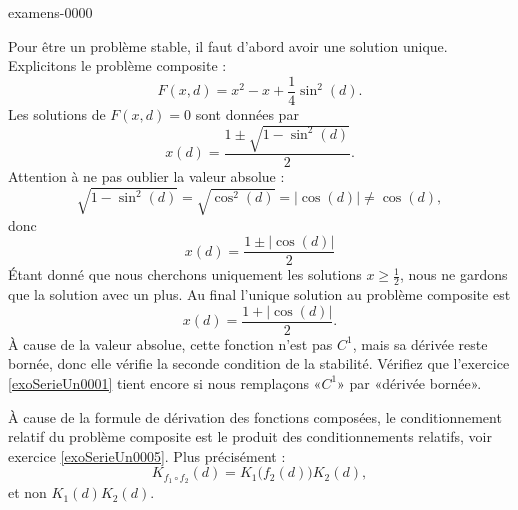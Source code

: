 
\begin{corrige}{examens-0000}

Pour être un problème stable, il faut d'abord avoir une solution unique. Explicitons le problème composite :
\begin{equation}
	F(x,d)=x^2-x+\frac{1}{ 4 }\sin^2(d).
\end{equation}
Les solutions de $F(x,d)=0$ sont données par
\begin{equation}
	x(d)=\frac{ 1\pm\sqrt{1-\sin^2(d)} }{2}.
\end{equation}
Attention à ne pas oublier la valeur absolue :
\begin{equation}
	\sqrt{1-\sin^2(d)}=\sqrt{\cos^2(d)}=| \cos(d) |\neq\cos(d),
\end{equation}
donc
\begin{equation}
	x(d)=\frac{ 1\pm| \cos(d) | }{2}
\end{equation}
Étant donné que nous cherchons uniquement les solutions $x\geq\frac{ 1 }{2}$, nous ne gardons que la solution avec un plus. Au final l'unique solution au problème composite est
\begin{equation}
	x(d)=\frac{ 1+| \cos(d) | }{2}.
\end{equation}
À cause de la valeur absolue, cette fonction n'est pas $C^1$, mais sa dérivée reste bornée, donc elle vérifie la seconde condition de la stabilité. Vérifiez que l'exercice \ref{exoSerieUn0001} tient encore si nous remplaçons «$C^1$» par «dérivée bornée».

À cause de la formule de dérivation des fonctions composées, le conditionnement relatif du problème composite est le produit des conditionnements relatifs, voir exercice \ref{exoSerieUn0005}. Plus précisément :
\begin{equation}
	K_{f_1\circ f_2}(d)=K_1\big( f_2(d) \big)K_2(d),
\end{equation}
et non $K_1(d)K_2(d)$. 


\end{corrige}
